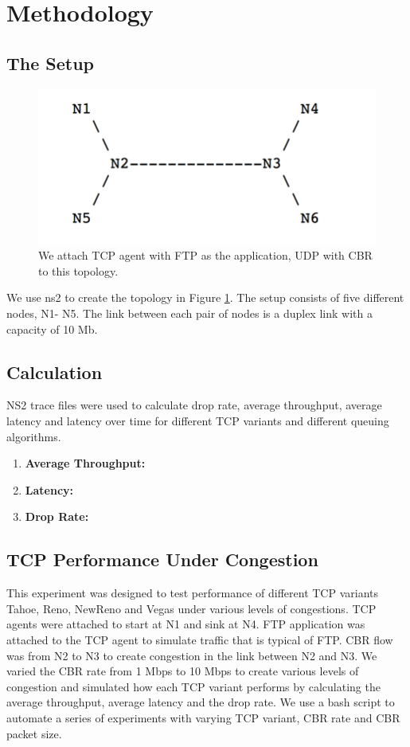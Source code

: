  \section{Methodology}\label{sec:methodology}
  \subsection{The Setup}
  \begin{figure}[!htbp]
  	\centering 
	\includegraphics[scale=0.4]{setup.png}
	\caption{We attach TCP agent with FTP as the application, UDP with CBR to this topology.}
	\label{fig:setup}
\end{figure}
We use ns2 to create the topology in Figure \ref{fig:setup}. The setup consists of five different nodes, N1- N5. The link between each pair of nodes is a duplex link with a capacity of 10 Mb.
\subsection{Calculation}
NS2 trace files were used to calculate drop rate, average throughput, average latency and latency over time for different TCP variants and different queuing algorithms. 
\begin{enumerate}
\item \textbf{Average Throughput:}
\item \textbf{Latency:}
\item \textbf{Drop Rate:}
\end{enumerate}


 \subsection{TCP Performance Under Congestion}
This experiment was designed to test performance of different TCP variants Tahoe, Reno, NewReno and Vegas under various levels of congestions. TCP agents were attached to start at N1 and sink at N4. FTP application was attached to the TCP agent to simulate traffic that is typical of FTP. CBR flow was from N2 to N3 to create congestion in the link between N2 and N3. We varied the CBR rate from 1 Mbps to 10 Mbps to create various levels of congestion and simulated how each TCP variant performs by calculating the average throughput, average latency and the drop rate. We use a bash script to automate a series of experiments with varying TCP variant, CBR rate and CBR packet size. 
